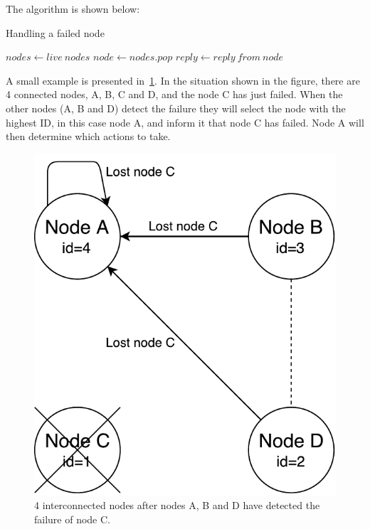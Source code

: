 \documentclass{cslthse-msc}
\begin{document}
The algorithm is shown below: %

\begin{algorithm}\label{alg:node_failure}
	\caption{Handling a failed node}
	\begin{algorithmic}[1]
	\State $nodes\gets live\ nodes$
	\Do
		\State $node\gets nodes.pop$
		\State
		\State $reply\gets reply\ from\ node$
	\end{algorithmic}
\end{algorithm}

A small example is presented in~\cref{fig:handling_node_failure}. In the situation shown in the figure, there are 4 connected nodes, A, B, C and D, and the node C has just failed. When the other nodes (A, B and D) detect the failure they will select the node with the highest ID, in this case node A, and inform it that node C has failed. Node A will then determine which actions to take.

\begin{figure}[!hbt]
\centering
\includegraphics[scale=0.5]{images/handling_node_failure.pdf}
\caption{4 interconnected nodes after nodes A, B and D have detected the failure of node C.}\label{fig:handling_node_failure}
\end{figure}
\end{document}
